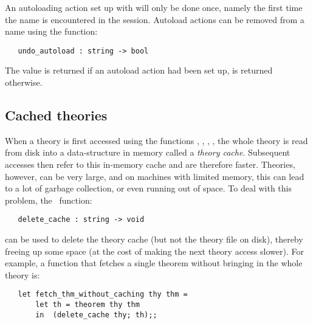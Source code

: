 {{An autoloading action set up with  will only be done once,
namely the first time the name is encountered in the session.  Autoload actions
can be removed from a name using the function:

\begin{boxed}
\begin{verbatim}
   undo_autoload : string -> bool
\end{verbatim}\end{boxed}

The value  is returned
if an autoload action had been set up,  is returned otherwise.

\subsection{Cached theories}

When a  theory  is  first  accessed  using   the  functions  ,
, ,  \etc, the  whole theory  is read from
disk into a data-structure in memory called a {\it theory cache\/}.  Subsequent
accesses then refer to this in-memory cache  and are  therefore faster.   Theories,
however, can be very large, and on machines with limited memory,
this can  lead to a lot of
garbage collection, or even running out of space.  To deal with
this problem, the \ML\ function:

\begin{boxed}
\begin{verbatim}
   delete_cache : string -> void
\end{verbatim}\end{boxed}


\noindent can be used to delete the theory cache (but not the theory 
file on disk), thereby 
freeing up some space (at the cost of making the next theory access slower). 
For example, a function that fetches a single theorem without 
bringing in the whole theory is:

\begin{hol}\begin{verbatim}
   let fetch_thm_without_caching thy thm =
       let th = theorem thy thm
       in  (delete_cache thy; th);;
\end{verbatim}\end{hol}

}}
